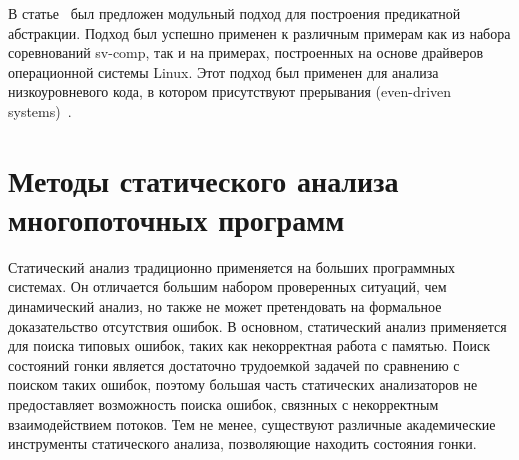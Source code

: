 
В статье~\cite{Kusano:2016:FCT} был предложен модульный подход для построения предикатной абстракции.
Подход был успешно применен к различным примерам как из набора соревнований sv-comp, так и на примерах, построенных на основе драйверов операционной системы Linux.
Этот подход был применен для анализа низкоуровневого кода, в котором присутствуют прерывания (even-driven systems)~\cite{Sung:2017}.

\section{Методы статического анализа многопоточных программ}
\label{rw:static}

Статический анализ традиционно применяется на больших программных системах.
Он отличается большим набором проверенных ситуаций, чем динамический анализ, но также не может претендовать на формальное доказательство отсутствия ошибок.
В основном, статический анализ применяется для поиска типовых ошибок, таких как некорректная работа с памятью.
Поиск состояний гонки является достаточно трудоемкой задачей по сравнению с поиском таких ошибок, поэтому большая часть статических анализаторов не предоставляет возможность поиска ошибок, связнных с некорректным взаимодействием потоков.
Тем не менее, существуют различные академические инструменты статического анализа, позволяющие находить состояния гонки.

